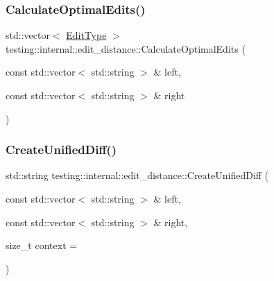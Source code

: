 \mbox{\label{namespacetesting_1_1internal_1_1edit__distance_a32267b2ae24de1de175ac8217406877d}} 
\subsubsection{\texorpdfstring{CalculateOptimalEdits()}{CalculateOptimalEdits()}\hspace{0.1cm}{\footnotesize\ttfamily [2/2]}}
{\footnotesize\ttfamily std\+::vector$<$ \mbox{\hyperlink{namespacetesting_1_1internal_1_1edit__distance_ad46aa6da12aec1a3f166310478b53a08}{Edit\+Type}} $>$ testing\+::internal\+::edit\+\_\+distance\+::\+Calculate\+Optimal\+Edits (\begin{DoxyParamCaption}\item[{const std\+::vector$<$ std\+::string $>$ \&}]{left,  }\item[{const std\+::vector$<$ std\+::string $>$ \&}]{right }\end{DoxyParamCaption})}

\mbox{\label{namespacetesting_1_1internal_1_1edit__distance_ac4c24a581ff433d7aca7ed12c9133fb1}} 
\subsubsection{\texorpdfstring{CreateUnifiedDiff()}{CreateUnifiedDiff()}}
{\footnotesize\ttfamily std\+::string testing\+::internal\+::edit\+\_\+distance\+::\+Create\+Unified\+Diff (\begin{DoxyParamCaption}\item[{const std\+::vector$<$ std\+::string $>$ \&}]{left,  }\item[{const std\+::vector$<$ std\+::string $>$ \&}]{right,  }\item[{size\+\_\+t}]{context = {} }\end{DoxyParamCaption})}

